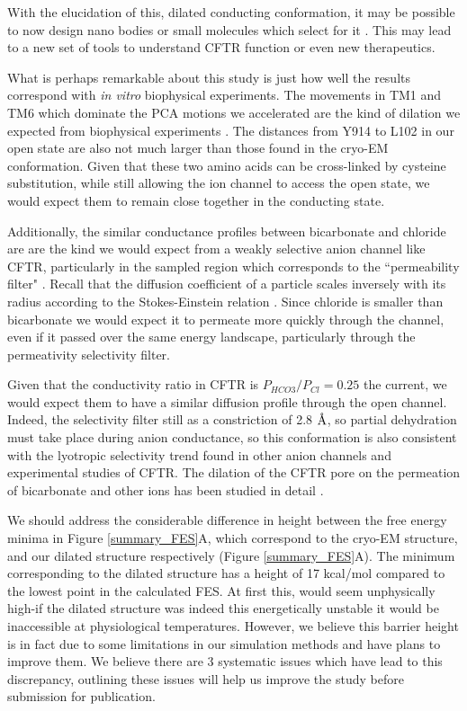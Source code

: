 With the elucidation of this, dilated conducting conformation, it may be possible to now design nano bodies or small molecules which select for it \cite{hutter2019}. This may lead to a new set of tools to understand CFTR function or even new therapeutics. 


What is perhaps remarkable about this study is just how well the results correspond with \textit{in vitro} biophysical experiments. The movements in TM1 and TM6 which dominate the PCA motions we accelerated are the kind of dilation we expected from biophysical experiments \cite{linsdell2016}. The distances from Y914 to L102 in our open state are also not much larger than those found in the cryo-EM conformation. Given that these two amino acids can be cross-linked by cysteine substitution, while still allowing the ion channel to access the open state, we would expect them to remain close together in the conducting state\cite{negoda2019}. 

Additionally, the similar conductance profiles between bicarbonate and chloride are are the kind we would expect from a weakly selective anion channel like CFTR, particularly in the sampled region which corresponds to the ``permeability filter" \cite{linsdell2016}. Recall that the diffusion coefficient of a particle scales inversely with its radius according to the Stokes-Einstein relation \cite{miller1924}. Since chloride is smaller than bicarbonate we would expect it to permeate more quickly through the channel, even if it passed over the same energy landscape, particularly through the permeativity selectivity filter. 

Given that the conductivity ratio in CFTR is $P_{HCO3}/P_{Cl}=0.25$ the current, we would expect them to have a similar diffusion profile through the open channel. Indeed, the selectivity filter still as a constriction of 2.8 $\textup{\AA}$, so partial dehydration must take place during anion conductance, so this conformation is also consistent with the lyotropic selectivity trend found in other anion channels and experimental studies of CFTR. The dilation of the CFTR pore on the permeation of bicarbonate and other ions has been studied in detail \cite{jun2016, kim2019}.

We should address the considerable difference in height between the free energy minima in Figure \ref{summary_FES}A, which correspond to the cryo-EM structure, and our dilated structure respectively (Figure \ref{summary_FES}A). The minimum corresponding to the dilated structure has a height of 17 kcal/mol compared to the lowest point in the calculated FES. At first this, would seem unphysically high-if the dilated structure was indeed this energetically unstable it would be inaccessible at physiological temperatures. However, we believe this barrier height is in fact due to some limitations in our simulation methods and have plans to improve them. We believe there are 3 systematic issues which have lead to this discrepancy, outlining these issues will help us improve the study before submission for publication. 

